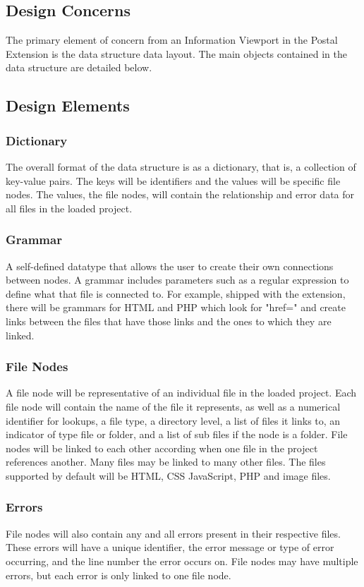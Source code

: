 \documentclass[letterpaper,10pt,titlepage,draftclsnofoot,onecolumn,onesided] {IEEEtran}
\begin{document}
\subsection{Design Concerns}
The primary element of concern from an Information Viewport in the Postal Extension is the data structure data layout. 
The main objects contained in the data structure are detailed below.

\subsection{Design Elements}

\subsubsection{Dictionary}
The overall format of the data structure is as a dictionary, that is, a collection of key-value pairs. 
The keys will be identifiers and the values will be specific file nodes. 
The values, the file nodes, will contain the relationship and error data for all files in the loaded project.

\subsubsection{Grammar} A self-defined datatype that allows the user to create their own connections between nodes.
A grammar includes parameters such as a regular expression to define what that file is connected to.
For example, shipped with the extension, there will be grammars for HTML and PHP which look for "href=" and create links between the files that have those links and the ones to which they are linked.

\subsubsection{File Nodes}
A file node will be representative of an individual file in the loaded project. 
Each file node will contain the name of the file it represents, as well as a numerical identifier for lookups, a file type, a directory level, a list of files it links to, an indicator of type file or folder, and a list of sub files if the node is a folder.
File nodes will be linked to each other according when one file in the project references another. 
Many files may be linked to many other files.
The files supported by default will be HTML, CSS JavaScript, PHP and image files.
		
\subsubsection{Errors}
File nodes will also contain any and all errors present in their respective files.
These errors will have a unique identifier, the error message or type of error occurring, and the line number the error occurs on.
File nodes may have multiple errors, but each error is only linked to one file node.
\end{document}

